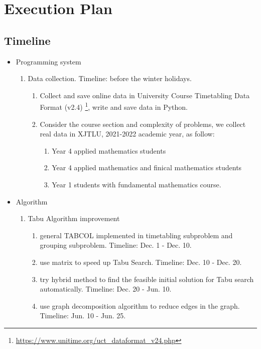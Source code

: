\documentclass{article}
\begin{document}
\newpage

\section{Execution Plan}
\label{sec: Execution Plan}
\subsection{Timeline}
\begin{itemize}
	\item Programming system
	      \begin{enumerate}
		      \item Data collection. Timeline: before the winter holidays.
		            \begin{enumerate}
			            \item Collect and save online data in University Course Timetabling Data Format (v2.4) \footnote{\url{https://www.unitime.org/uct_dataformat_v24.php}}, write and save data in Python.
			            \item Consider the course section and complexity of problems, we collect real data in XJTLU, 2021-2022 academic year, as follow:
			                  \begin{enumerate}
				                  \item Year 4 applied mathematics students
				                  \item Year 4 applied mathematics and finical mathematics students
				                  \item Year 1 students with fundamental mathematics course.
			                  \end{enumerate}
		            \end{enumerate}
	      \end{enumerate}
	\item Algorithm
	      \begin{enumerate}
		      \item Tabu Algorithm improvement
		            \begin{enumerate}
						\item general TABCOL implemented in timetabling subproblem and grouping subproblem. Timeline: Dec. 1 - Dec. 10.
						\item use matrix to speed up Tabu Search. Timeline: Dec. 10 - Dec. 20.
						\item try hybrid method to find the feasible initial solution for Tabu search automatically. Timeline: Dec. 20 - Jun. 10.
						\item use graph decomposition algorithm to reduce edges in the graph. Timeline: Jun. 10 - Jun. 25.

\end{enumerate}
\end{enumerate}
\end{itemize}
\end{document}
